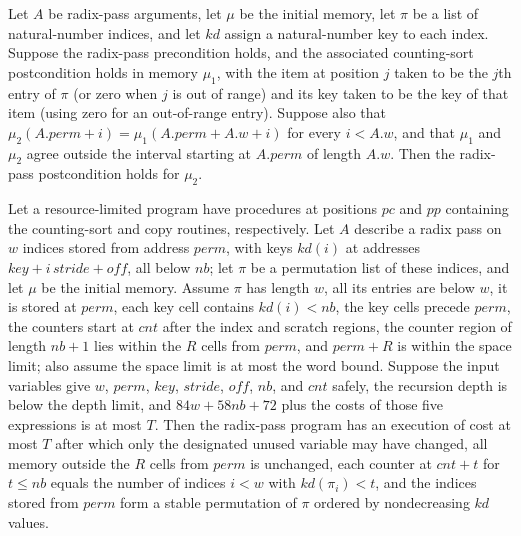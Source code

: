 \begin{theorem}
\label{Light.RadixPass.Post.of_sorted_copied}
\leanok
{}
Let $A$ be radix-pass arguments, let $\mu$ be the initial memory, let $\pi$ be a list of
natural-number indices, and let $kd$ assign a natural-number key to each index. Suppose
the radix-pass precondition holds, and the associated counting-sort postcondition holds
in memory $\mu_1$, with the item at position $j$ taken to be the $j$th entry of $\pi$
(or zero when $j$ is out of range) and its key taken to be the key of that item (using
zero for an out-of-range entry). Suppose also that $\mu_2(A.perm+i)=\mu_1(A.perm+A.w+i)$
for every $i<A.w$, and that $\mu_1$ and $\mu_2$ agree outside the interval starting at
$A.perm$ of length $A.w$. Then the radix-pass postcondition holds for $\mu_2$.
\end{theorem}

\begin{theorem}
\label{Light.radixPass_ends}
\leanok
{}
Let a resource-limited program have procedures at positions $pc$ and $pp$ containing the
counting-sort and copy routines, respectively. Let $A$ describe a radix pass on $w$
indices stored from address $perm$, with keys $kd(i)$ at addresses $key+i\,stride+off$,
all below $nb$; let $\pi$ be a permutation list of these indices, and let $\mu$ be the
initial memory. Assume $\pi$ has length $w$, all its entries are below $w$, it is stored
at $perm$, each key cell contains $kd(i)<nb$, the key cells precede $perm$, the counters
start at $cnt$ after the index and scratch regions, the counter region of length $nb+1$
lies within the $R$ cells from $perm$, and $perm+R$ is within the space limit; also
assume the space limit is at most the word bound. Suppose the input variables give $w$,
$perm$, $key$, $stride$, $off$, $nb$, and $cnt$ safely, the recursion depth is below the
depth limit, and $84w+58nb+72$ plus the costs of those five expressions is at most $T$.
Then the radix-pass program has an execution of cost at most $T$ after which only the
designated unused variable may have changed, all memory outside the $R$ cells from
$perm$ is unchanged, each counter at $cnt+t$ for $t\le nb$ equals the number of indices
$i<w$ with $kd(\pi_i)<t$, and the indices stored from $perm$ form a stable permutation
of $\pi$ ordered by nondecreasing $kd$ values.
\end{theorem}
